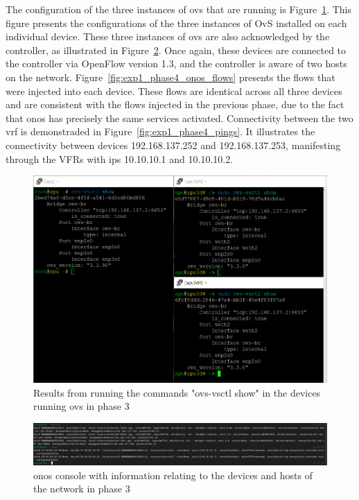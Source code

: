 The configuration of the three instances of \gls{ovs} that are running is Figure~\ref{fig:exp1_phase4_config}. This figure presents the configurations of the three instances of OvS installed on each individual device. These three instances of \gls{ovs} are also acknowledged by the controller, as illustrated in Figure~\ref{fig:exp1_phase4_onos}. Once again, these devices are connected to the controller via OpenFlow version 1.3, and the controller is aware of two hosts on the network. 
Figure~\ref{fig:exp1_phase4_onos_flows} presents the flows that were injected into each device. These flows are identical across all three devices and are consistent with the flows injected in the previous phase, due to the fact that \gls{onos} has precisely the same services activated.
Connectivity between the two \gls{vrf} is demonstraded in Figure~\ref{fig:exp1_phase4_pings}. It illustrates the connectivity between devices 192.168.137.252 and 192.168.137.253, manifesting through the VFRs with \glspl{ip} 10.10.10.1 and 10.10.10.2.

\begin{figure}
	\centering
	\includegraphics[width=\textwidth]{Chapters/Figures/tests/ovs_phase_4/ovs_config.PNG}
	\caption{Results from running the commands "ovs-vsctl show" in the devices running \gls{ovs} in phase 3}
	\label{fig:exp1_phase4_config}
\end{figure}

\begin{figure}
	\centering
	\includegraphics[width=\textwidth]{Chapters/Figures/tests/ovs_phase_4/onos_topology.PNG}
	\caption{\gls{onos} console with information relating to the devices and hosts of the network in phase 3}
	\label{fig:exp1_phase4_onos}
\end{figure}

